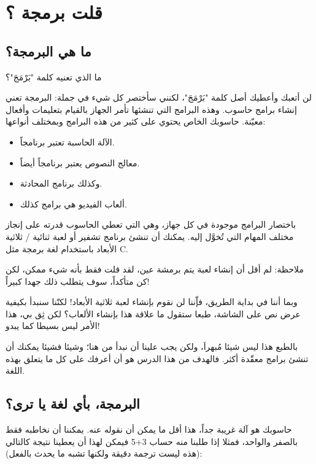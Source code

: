 \chapter{قلت برمجة ؟}
\section{ما هي البرمجة؟}
\begin{question}
  ما الذي تعنيه كلمة "بَرْمَجَ"؟
\end{question}

لن أتعبك وأعطيك أصل كلمة "بَرْمَجَ"، لكنني سأختصر كل شيء في جملة: البرمجة تعني إنشاء برامج حاسوب. وهذه البرامج التي تنشئها تأمر الجهاز بالقيام بتعليمات وأفعال معيّنة.
حاسوبك الخاص يحتوي على كثير من هذه البرامج وبمختلف أنواعها:

\begin{itemize}
  \item الآلة الحاسبة تعتبر برنامجاً.
  \item معالج النصوص يعتبر برنامجاً أيضاً.
  \item وكذلك برنامج المحادثة.
  \item ألعاب الفيديو هي برامج كذلك.
\end{itemize}

باختصار البرامج موجودة في كل جهاز، وهي التي تعطي الحاسوب قدرته على إنجاز مختلف المهام التي تُخوَّل إليه. يمكنك أن تنشئ برنامج تشفير أو لعبة ثنائية / ثلاثية الأبعاد باستخدام لغة برمجة مثل C.

ملاحظة: لم أقل أن إنشاء لعبة يتم برمشة عين، لقد قلت فقط بأنه شيء ممكن، لكن كن متأكداً، سوف يتطلب ذلك جهدا كبيراً!

وبما أننا في بداية الطريق، فإّننا لن نقوم بإنشاء لعبة ثلاثية الأبعاد! لكنّنا سنبدأ بكيفية عرض نص على الشاشة، طبعا ستقول ما علاقة هذا بإنشاء الألعاب؟ لكن ثِق بي، هذا الأمر ليس بسيطا كما يبدو!

بالطبع هذا ليس شيئا مُبهراَ، ولكن يجب علينا أن نبدأ من هنا؛ وشيئا فشيئا يمكنك أن تنشئ برامج معقّدة أكثر. فالهدف من هذا الدرس هو أن أعرفك على كل ما يتعلق بهذه اللغة.

\section{البرمجة، بأي لغة يا ترى؟}
حاسوبك هو آلة غريبة جداً، هذا أقل ما يمكن أن نقوله عنه. يمكننا أن نخاطبه فقط بالصفر والواحد، فمثلا إذا طلبنا منه حساب 3+5 فيمكن لهذا أن يعطينا نتيجة كالتالي (هذه ليست ترجمة دقيقة ولكنها تشبه ما يحدث بالفعل):\\

